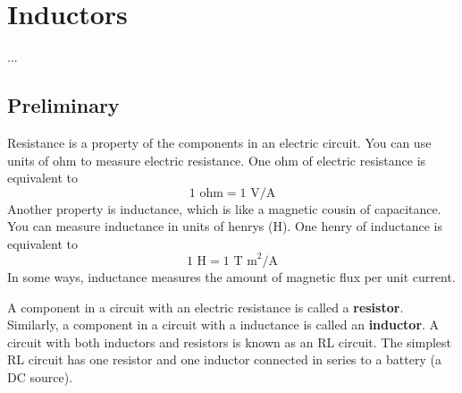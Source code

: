 \setcounter{chapter}{4}
\chapter{Inductors}
...
\section{Preliminary}
Resistance is a property of the components in an electric circuit. You can use units of ohm to measure electric resistance. One ohm of electric resistance is equivalent to
\begin{equation}
	1 \text{ ohm} = 1 \text{ V/A}
\end{equation}
Another property is inductance, which is like a magnetic cousin of capacitance. You can measure inductance in units of henrys (H). One henry of inductance is equivalent to
\begin{equation}
	1 \text{ H} = 1 \text{ T m}^{2}\text{/A}
\end{equation}
In some ways, inductance measures the amount of magnetic flux per unit current.

A component in a circuit with an electric resistance is called a \textbf{resistor}. Similarly, a component in a circuit with a inductance is called an \textbf{inductor}. A circuit with both inductors and resistors is known as an RL circuit. The simplest RL circuit has one resistor and one inductor connected in series to a battery (a DC source).

